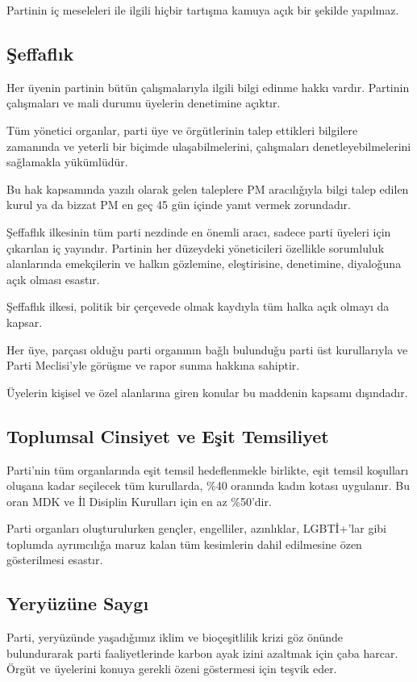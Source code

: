 \documentclass[11pt]{article} %
\begin{document}
Partinin iç meseleleri ile ilgili hiçbir tartışma kamuya açık bir şekilde yapılmaz.

\subsection{Şeffaflık}
Her üyenin partinin bütün çalışmalarıyla ilgili bilgi edinme hakkı vardır. Partinin çalışmaları ve mali durumu üyelerin denetimine açıktır.

Tüm yönetici organlar, parti üye ve örgütlerinin talep ettikleri bilgilere zamanında ve yeterli bir biçimde ulaşabilmelerini, çalışmaları denetleyebilmelerini saǧlamakla yükümlüdür.

Bu hak kapsamında yazılı olarak gelen taleplere PM aracılıǧıyla bilgi talep edilen kurul ya da bizzat PM en geç 45 gün içinde yanıt vermek zorundadır.

Şeffaflık ilkesinin tüm parti nezdinde en önemli aracı, sadece parti üyeleri için çıkarılan iç yayındır. Partinin her düzeydeki yöneticileri özellikle sorumluluk alanlarında emekçilerin ve halkın gözlemine, eleştirisine, denetimine, diyaloǧuna açık olması esastır.

Şeffaflık ilkesi, politik bir çerçevede olmak kaydıyla tüm halka açık olmayı da
kapsar.

Her üye, parçası olduǧu parti organının baǧlı bulunduǧu parti üst kurullarıyla ve Parti Meclisi’yle görüşme ve rapor sunma hakkına sahiptir.

Üyelerin kişisel ve özel alanlarına giren konular bu maddenin kapsamı dışındadır.

\subsection{Toplumsal Cinsiyet ve Eşit Temsiliyet}
Parti’nin tüm organlarında eşit temsil hedeflenmekle birlikte, eşit temsil koşulları oluşana kadar seçilecek tüm kurullarda, \%40 oranında kadın kotası uygulanır. Bu oran MDK ve İl Disiplin Kurulları için en az \%50’dir.

Parti organları oluşturulurken gençler, engelliler, azınlıklar, LGBTİ+’lar gibi toplumda ayrımcılıǧa maruz kalan tüm kesimlerin dahil edilmesine özen gösterilmesi esastır.
\subsection{Yeryüzüne Saygı}
Parti, yeryüzünde yaşadıǧımız iklim ve bioçeşitlilik krizi göz önünde bulundurarak parti faaliyetlerinde karbon ayak izini azaltmak için çaba harcar. Örgüt ve üyelerini konuya gerekli özeni göstermesi için teşvik eder.
\end{document}
